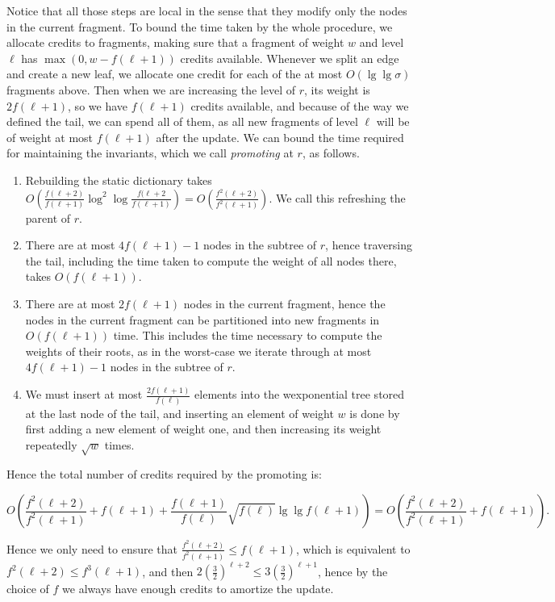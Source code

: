 \documentclass[11pt,onecolumn,final]{article} \usepackage{a4}
\theoremstyle{plain}
\theoremstyle{remark}
\begin{document}
Notice that all those steps are local in the sense that they modify only the nodes in the current fragment. To bound the time taken by the whole procedure,
we allocate credits to fragments, making sure that a fragment of weight $w$ and level $\ell$ has $\max(0,w-f(\ell+1))$ credits available.
Whenever we split an edge and create a new leaf, we allocate one credit for each of the at most $O(\lg\lg\sigma)$ fragments above. Then when we are increasing the level of $r$, its weight is $2f(\ell+1)$, so we have $f(\ell+1)$ credits available, and because of the way we defined the tail, we can spend all of them, as all new fragments of level $\ell$ will be of weight at most $f(\ell+1)$ after the update. We can bound the time required for maintaining the invariants, which we call \emph{promoting} at $r$, as follows.

\begin{enumerate}
\item Rebuilding the static dictionary takes $O(\frac{f(\ell+2)}{f(\ell+1)}\log^2\log\frac{f(\ell+2}{f(\ell+1)})=O(\frac{f^2(\ell+2)}{f^2(\ell+1)})$. We call this refreshing the parent of $r$.
\item There are at most $4f(\ell+1)-1$ nodes in the subtree of $r$, hence traversing the tail, including the time taken to compute the weight of all nodes there, takes $O(f(\ell+1))$.
\item There are at most $2f(\ell+1)$ nodes in the current fragment, hence the nodes in the current fragment can be partitioned into new fragments in $O(f(\ell+1))$ time. This includes the time necessary to compute the weights of their roots, as in the worst-case we iterate through at most $4f(\ell+1)-1$ nodes in the subtree of $r$.
\item We must insert at most $\frac{2f(\ell+1)}{f(\ell)}$ elements into the wexponential tree stored at the last node of the tail, and inserting an element of weight $w$ is done by first adding a new element of weight one, and then increasing its weight repeatedly $\sqrt{w}$ times.
\end{enumerate}

Hence the total number of credits required by the promoting is:

$$ O\left(\frac{f^{2}(\ell+2)}{f^{2}(\ell+1)} +  f(\ell+1) + \frac{f(\ell+1)}{f(\ell)} \sqrt{f(\ell)}\lg\lg f(\ell+1)\right) = O\left(\frac{f^{2}(\ell+2)}{f^{2}(\ell+1)} + f(\ell+1)\right). $$

Hence we only need to ensure that $\frac{f^{2}(\ell+2)}{f^{2}(\ell+1)} \leq f(\ell+1)$, which is equivalent to $f^{2}(\ell+2) \leq f^{3}(\ell+1)$, and then $2(\frac{3}{2})^{\ell+2} \leq 3(\frac{3}{2})^{\ell+1}$, hence by the choice of $f$ we always have enough credits to amortize the update.
\end{document}
